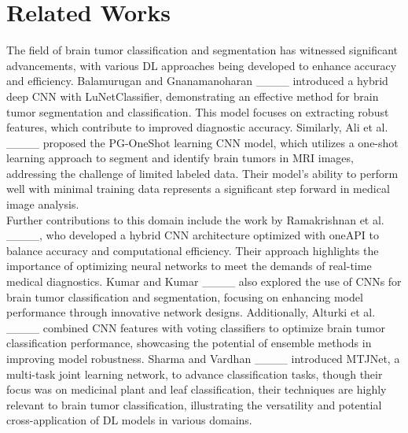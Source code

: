 \section{Related Works}
\label{sec2}
The field of brain tumor classification and segmentation has witnessed significant advancements, with various DL approaches being developed to enhance accuracy and efficiency. Balamurugan and Gnanamanoharan ____ introduced a hybrid deep CNN with LuNetClassifier, demonstrating an effective method for brain tumor segmentation and classification. This model focuses on extracting robust features, which contribute to improved diagnostic accuracy. Similarly, Ali et al. ____ proposed the PG-OneShot learning CNN model, which utilizes a one-shot learning approach to segment and identify brain tumors in MRI images, addressing the challenge of limited labeled data. Their model's ability to perform well with minimal training data represents a significant step forward in medical image analysis.\\
Further contributions to this domain include the work by Ramakrishnan et al. ____, who developed a hybrid CNN architecture optimized with oneAPI to balance accuracy and computational efficiency. Their approach highlights the importance of optimizing neural networks to meet the demands of real-time medical diagnostics. Kumar and Kumar ____ also explored the use of CNNs for brain tumor classification and segmentation, focusing on enhancing model performance through innovative network designs. Additionally, Alturki et al. ____ combined CNN features with voting classifiers to optimize brain tumor classification performance, showcasing the potential of ensemble methods in improving model robustness. Sharma and Vardhan ____ introduced MTJNet, a multi-task joint learning network, to advance classification tasks, though their focus was on medicinal plant and leaf classification, their techniques are highly relevant to brain tumor classification, illustrating the versatility and potential cross-application of DL models in various domains. \\
